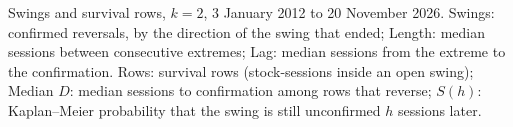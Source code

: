 \begin{table}[!htbp]
\centering
\caption{Swings and survival rows, $k=2$, 3 January 2012 to 20 November 2026. Swings: confirmed
reversals, by the direction of the swing that ended; Length: median sessions between consecutive
extremes; Lag: median sessions from the extreme to the confirmation. Rows: survival rows (stock-sessions
inside an open swing); Median $D$: median sessions to confirmation among rows that reverse;
$S(h)$: Kaplan--Meier probability that the swing is still unconfirmed $h$ sessions
later.}\label{tab:desc}
\footnotesize
\setlength{\tabcolsep}{4pt}
\end{table}
